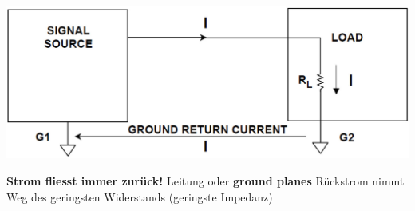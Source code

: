\begin{minipage}[c]{0.48\columnwidth}
    \includegraphics[width=\columnwidth]{images/signalfluss_pcb.jpg}
\end{minipage}
\hfill
\begin{minipage}[c]{0.48\columnwidth}
    \begin{outline}
        \1 \textbf{Strom fliesst immer zurück!}
            \2 Leitung oder \textbf{ground planes}
        \1 Rückstrom nimmt Weg des geringsten Widerstands (geringste Impedanz)
    \end{outline}
\end{minipage}

